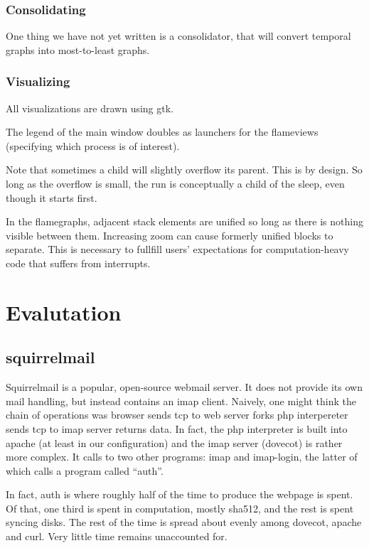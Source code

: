 \documentclass{article}
\begin{document}
\subsubsection{Consolidating}

One thing we have not yet written is a consolidator, that will convert temporal graphs into most-to-least graphs.

\subsubsection{Visualizing}

All visualizations are drawn using gtk.

The legend of the main window doubles as launchers for the flameviews (specifying which process is of interest).

Note that sometimes a child will slightly overflow its parent.  This is by design.  So long as the overflow is small, the run is conceptually a child of the sleep, even though it starts first.

In the flamegraphs, adjacent stack elements are unified so long as there is nothing visible between them.  Increasing zoom can cause formerly unified blocks to separate.  This is necessary to fullfill users' expectations for computation-heavy code that suffers from interrupts.

\section{Evalutation}
\subsection{squirrelmail}

Squirrelmail is a popular, open-source webmail server.  It does not provide its own mail handling, but instead contains an imap client.  Naively, one might think the chain of operations was browser sends tcp to web server forks php interpereter sends tcp to imap server returns data.  In fact, the php interpreter is built into apache (at least in our configuration) and the imap server (dovecot) is rather more complex.  It calls to two other programs: imap and imap-login, the latter of which calls a program called ``auth''.

In fact, auth is where roughly half of the time to produce the webpage is spent.  Of that, one third is spent in computation, mostly sha512, and the rest is spent syncing disks.  The rest of the time is spread about evenly among dovecot, apache and curl.  Very little time remains unaccounted for.
\end{document}
